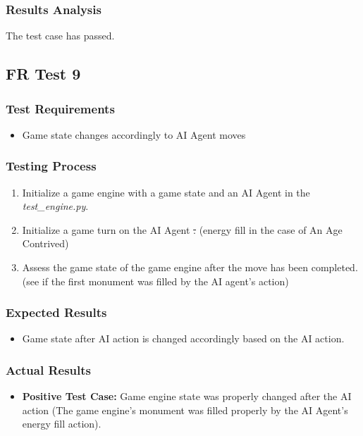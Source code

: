 \documentclass[12pt, titlepage]{article}
\providecommand{\DIFaddtex}[1]{{\protect\color{blue}\uwave{#1}}} %
\providecommand{\DIFdeltex}[1]{{\protect\color{red}\sout{#1}}}                      %
\providecommand{\DIFaddbegin}{} %
\providecommand{\DIFaddend}{} %
\providecommand{\DIFdelbegin}{} %
\providecommand{\DIFdelend}{} %
\providecommand{\DIFadd}[1]{\texorpdfstring{\DIFaddtex{#1}}{#1}} %
\providecommand{\DIFdel}[1]{\texorpdfstring{\DIFdeltex{#1}}{}} %
\begin{document}
\subsubsection{Results Analysis}
The test case has passed.

\subsection{FR Test 9}\DIFaddbegin \label{FRT9} 
\DIFaddend \subsubsection{Test Requirements}
\begin{itemize}
    \item Game state changes accordingly to AI Agent moves
\end{itemize}
\subsubsection{Testing Process}
\begin{enumerate}
    \item Initialize a game engine with a game state and an AI Agent in the \textit{test\_engine.py}. 
    \item Initialize a game turn on the AI Agent \DIFdelbegin \DIFdel{. }\DIFdelend (energy fill in the case of An Age Contrived)\DIFaddbegin \DIFadd{.
    }\DIFaddend \item Assess the game state of the game engine after the move has been completed. (see if the first monument was filled by the AI agent's action)
\end{enumerate}
\subsubsection{Expected Results}
\begin{itemize}
    \item Game state after AI action is changed accordingly based on the AI action.
\end{itemize}
\subsubsection{Actual Results}
\begin{itemize}
    \item \textbf{Positive Test Case:} Game engine state was properly changed after the AI action (The game engine's monument was filled properly by the AI Agent's energy fill action).
\end{itemize}
\end{document}
